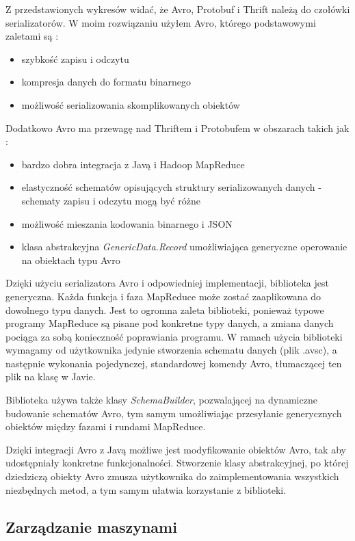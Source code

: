 \documentclass{pracamgr}
\begin{document}
Z przedstawionych wykresów widać, że Avro, Protobuf i Thrift należą do czołówki serializatorów. W moim rozwiązaniu użyłem Avro, którego podstawowymi zaletami są \cite{avro}:
\begin{itemize}
    \item szybkość zapisu i odczytu
    \item kompresja danych do formatu binarnego
    \item możliwość serializowania skomplikowanych obiektów
\end{itemize}

Dodatkowo Avro ma przewagę nad Thriftem i Protobufem w obszarach takich jak \cite{avro, thrift, protobuf}:
\begin{itemize}
    \item bardzo dobra integracja z Javą i Hadoop MapReduce
    \item elastyczność schematów opisujących struktury serializowanych danych - schematy zapisu i odczytu mogą być różne
    \item możliwość mieszania kodowania binarnego i JSON
    \item klasa abstrakcyjna \textit{GenericData.Record} umożliwiająca generyczne operowanie na obiektach typu Avro
\end{itemize}

Dzięki użyciu serializatora Avro i odpowiedniej implementacji, biblioteka jest generyczna. Każda funkcja i faza MapReduce może zostać zaaplikowana do dowolnego typu danych. Jest to ogromna zaleta biblioteki, ponieważ typowe programy MapReduce są pisane pod konkretne typy danych, a zmiana danych pociąga za sobą konieczność poprawiania programu. W ramach użycia biblioteki wymagamy od użytkownika jedynie stworzenia schematu danych (plik .avsc), a następnie wykonania pojedynczej, standardowej komendy Avro, tłumaczącej ten plik na klasę w Javie.

Biblioteka używa także klasy \textit{SchemaBuilder}, pozwalającej na dynamiczne budowanie schematów Avro, tym samym umożliwiając przesyłanie generycznych obiektów między fazami i rundami MapReduce.

Dzięki integracji Avro z Javą możliwe jest modyfikowanie obiektów Avro, tak aby udostępniały konkretne funkcjonalności. Stworzenie klasy abstrakcyjnej, po której dziedziczą obiekty Avro zmusza użytkownika do zaimplementowania wszystkich niezbędnych metod, a tym samym ułatwia korzystanie z biblioteki.

\subsection{Zarządzanie maszynami}
\end{document}
